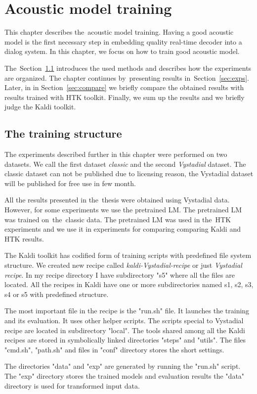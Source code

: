 \chapter{Acoustic model training}
\label{cha:training}

This chapter describes the~acoustic model training.
Having a good acoustic model is the first necessary step in embedding 
quality real-time decoder into a dialog system.
In this chapter, we focus on how to train good acoustic model.

The~Section~\ref{sec:setup} introduces the used methods and describes 
how the experiments are organized. The chapter continues by~presenting results in~Section~\ref{sec:exps}. 
Later, in in Section~\ref{sec:compare} we briefly compare the obtained 
results with results trained with \ac{HTK} toolkit.
Finally, we sum up the results and we briefly judge the Kaldi toolkit.

\section{The training structure} 
\label{sec:setup}

The experiments described further in this chapter were performed on two datasets.
We call the first dataset {\it classic}\/ and the second {\it Vystadial}\/ dataset.
The classic dataset can not be published due to licensing reason, 
the Vystadial dataset will be published for free use in few month.

All the results presented in the~thesis were obtained using Vystadial data.
However, for some experiments we use the pretrained \acl{LM}.
The pretrained \ac{LM} was trained on~the~classic data.
The pretrained \ac{LM} was used in the~\ac{HTK} experiments and we use it in experiments for comparing 
comparing Kaldi and \ac{HTK} results.

\small{The Kaldi toolkit has codified form of training scripts with predefined file system structure. 
We created new recipe called {\it kaldi-Vystadial-recipe}\/ or just {\it Vystadial recipe}. 
In my recipe directory I have subdirectory "s5" where all the files are located. All the recipes in Kaldi have 
 one or more subdirectories named s1, s2, s3, s4 or s5 with predefined structure.

The most important file in the recipe is the "run.sh" file. It launches the training and its evaluation.
It uses other helper scripts. The scripts special to Vystadial recipe are located in subdirectory "local".
The tools shared among all the Kaldi recipes are stored in symbolically linked directories "steps" and "utils".
The files "cmd.sh", "path.sh" and files in "conf" directory stores the short settings.

The directories "data" and "exp" are generated by running the "run.sh" script.
The "exp" directory stores the trained models and evaluation results the "data" 
directory is used for transformed input data.}

